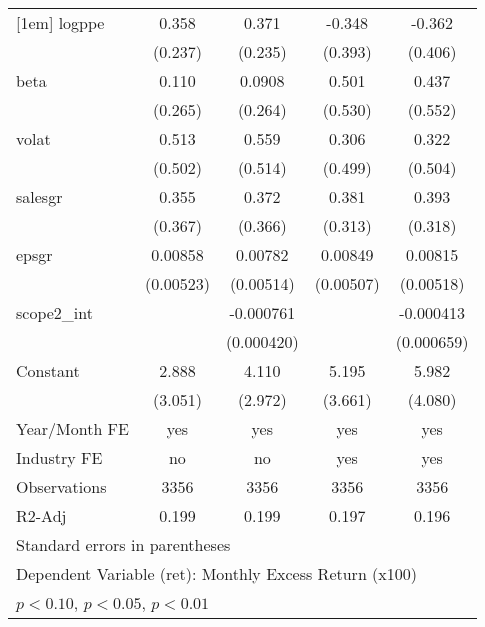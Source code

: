 \begin{table}[htbp]
\begin{tabular}{l*{4}{c}}
[1em]
logppe              &       0.358         &       0.371         &      -0.348         &      -0.362         \\
                    &     (0.237)         &     (0.235)         &     (0.393)         &     (0.406)         \\
[1em]
beta                &       0.110         &      0.0908         &       0.501         &       0.437         \\
                    &     (0.265)         &     (0.264)         &     (0.530)         &     (0.552)         \\
[1em]
volat               &       0.513         &       0.559         &       0.306         &       0.322         \\
                    &     (0.502)         &     (0.514)         &     (0.499)         &     (0.504)         \\
[1em]
salesgr             &       0.355         &       0.372         &       0.381         &       0.393         \\
                    &     (0.367)         &     (0.366)         &     (0.313)         &     (0.318)         \\
[1em]
epsgr               &     0.00858         &     0.00782         &     0.00849\sym{*}  &     0.00815         \\
                    &   (0.00523)         &   (0.00514)         &   (0.00507)         &   (0.00518)         \\
[1em]
scope2\_int          &                     &   -0.000761\sym{*}  &                     &   -0.000413         \\
                    &                     &  (0.000420)         &                     &  (0.000659)         \\
[1em]
Constant            &       2.888         &       4.110         &       5.195         &       5.982         \\
                    &     (3.051)         &     (2.972)         &     (3.661)         &     (4.080)         \\
\hline
Year/Month FE       &         yes         &         yes         &         yes         &         yes         \\
Industry FE         &          no         &          no         &         yes         &         yes         \\
Observations        &        3356         &        3356         &        3356         &        3356         \\
R2-Adj              &       0.199         &       0.199         &       0.197         &       0.196         \\
\hline\hline
\multicolumn{5}{l}{\footnotesize Standard errors in parentheses}\\
\multicolumn{5}{l}{\footnotesize Dependent Variable (ret): Monthly Excess Return (x100)}\\
\multicolumn{5}{l}{\footnotesize \sym{*} \(p<0.10\), \sym{**} \(p<0.05\), \sym{***} \(p<0.01\)}\\
\end{tabular}
\end{table}
